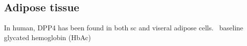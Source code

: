 \subsection{Adipose tissue}
In human, DPP4 has been found in both sc and viseral adipose cells.~\cite{Lamers2011} baseline glycated hemoglobin (HbA\1c) 